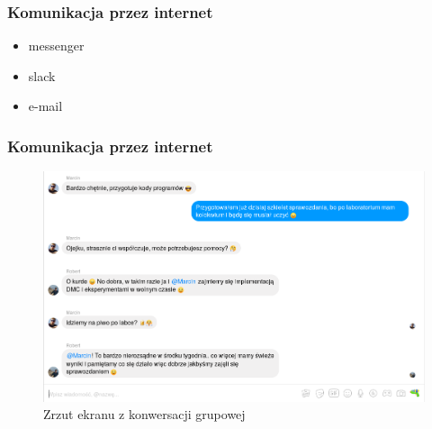 \begin{frame}
    \frametitle{Komunikacja przez internet}
    \begin{itemize}
        \item messenger
        \item slack
        \item e-mail
    \end{itemize}
\end{frame}

\begin{frame}
    \frametitle{Komunikacja przez internet}
    \begin{figure}
        \centering
        \includegraphics[scale=0.3]{./images/messenger_example.png}
        \caption{Zrzut ekranu z konwersacji grupowej}
    \end{figure}
\end{frame}



